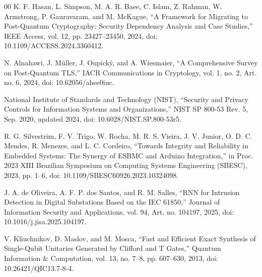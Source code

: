 \documentclass[journal]{IEEEtran} %
\begin{document}
\begin{thebibliography}{00}
 K. F. Hasan, L. Simpson, M. A. R. Baee, C. Islam, Z. Rahman, W. Armstrong, P. Gauravaram, and M. McKague, “A Framework for Migrating to Post-Quantum Cryptography: Security Dependency Analysis and Case Studies,” IEEE Access, vol. 12, pp. 23427–23450, 2024, doi: 10.1109/ACCESS.2024.3360412.

 N. Alnahawi, J. Müller, J. Oupický, and A. Wiesmaier, “A Comprehensive Survey on Post-Quantum TLS,” IACR Communications in Cryptology, vol. 1, no. 2, Art. no. 6, 2024, doi: 10.62056/ahee0iuc.

 National Institute of Standards and Technology (NIST), “Security and Privacy Controls for Information Systems and Organizations,” NIST SP 800-53 Rev. 5, Sep. 2020, updated 2024, doi: 10.6028/NIST.SP.800-53r5.

 R. G. Silvestrim, F. V. Trigo, W. Rocha, M. R. S. Vieira, J. V. Junior, O. D. C. Mendes, R. Menezes, and L. C. Cordeiro, “Towards Integrity and Reliability in Embedded Systems: The Synergy of ESBMC and Arduino Integration,” in Proc. 2023 XIII Brazilian Symposium on Computing Systems Engineering (SBESC), 2023, pp. 1–6, doi: 10.1109/SBESC60926.2023.10324098.

 J. A. de Oliveira, A. F. P. dos Santos, and R. M. Salles, “RNN for Intrusion Detection in Digital Substations Based on the IEC 61850,” Journal of Information Security and Applications, vol. 94, Art. no. 104197, 2025, doi: 10.1016/j.jisa.2025.104197.

 V. Kliuchnikov, D. Maslov, and M. Mosca, “Fast and Efficient Exact Synthesis of Single-Qubit Unitaries Generated by Clifford and T Gates,” Quantum Information \& Computation, vol. 13, no. 7--8, pp. 607--630, 2013, doi: 10.26421/QIC13.7-8-4.

\end{thebibliography}
\end{document}
